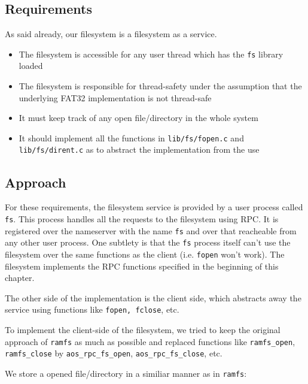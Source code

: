 \subsection{Requirements}
As said already, our filesystem is a filesystem as a service.
\begin{itemize}
    \item The filesystem is accessible for any user thread which has the \texttt{fs} library loaded
    \item The filesystem is responsible for thread-safety under the assumption that the underlying FAT32 implementation is not thread-safe
    \item It must keep track of any open file/directory in the whole system
    \item It should implement all the functions in \texttt{lib/fs/fopen.c} and \texttt{lib/fs/dirent.c} as to abstract the implementation from the use
\end{itemize}



\subsection{Approach}
For these requirements, the filesystem service is provided by a user process called \texttt{fs}.
This process handles all the requests to the filesystem using RPC. It is registered over the nameserver with the name \texttt{fs} and 
over that reacheable from any other user process. One subtlety is that the \texttt{fs} process itself can't use the filesystem over the same 
functions as the client (i.e. \texttt{fopen} won't work). The filesystem implements the RPC functions specified in the beginning of this chapter.

The other side of the implementation is the client side, which abstracts away the service using functions like \texttt{fopen, fclose}, etc.

To implement the client-side of the filesystem, we tried to keep the original approach of \texttt{ramfs}
as much as possible and replaced functions like \texttt{ramfs\_open}, \texttt{ramfs\_close}
by \texttt{aos\_rpc\_fs\_open}, \texttt{aos\_rpc\_fs\_close}, etc.

We store a opened file/directory in a similiar manner as in \texttt{ramfs}:

